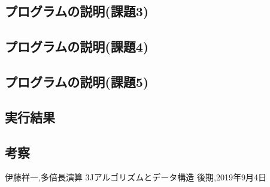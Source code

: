 \documentclass[dvipdfmx]{jarticle}
\begin{document}
    \subsection{プログラムの説明(課題3)}
    \subsection{プログラムの説明(課題4)}
    \subsection{プログラムの説明(課題5)}
    \subsection{実行結果}
    \subsection{考察}
    

        \begin{thebibliography}{9}
            伊藤祥一,多倍長演算 3Jアルゴリズムとデータ構造 後期,2019年9月4日
          \end{thebibliography}
\end{document}
